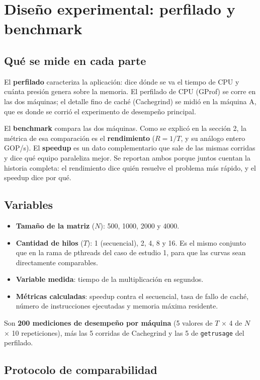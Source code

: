 \section{Diseño experimental: perfilado y benchmark}

\subsection{Qué se mide en cada parte}

El \textbf{perfilado} caracteriza la aplicación: dice dónde se va el tiempo de CPU y cuánta presión genera sobre la memoria. El perfilado de CPU (GProf) se corre en las dos máquinas; el detalle fino de caché (Cachegrind) se midió en la máquina A, que es donde se corrió el experimento de desempeño principal.

El \textbf{benchmark} compara las dos máquinas. Como se explicó en la sección 2, la métrica de esa comparación es el \textbf{rendimiento} ($R = 1/T$, y su análogo entero GOP/s). El \textbf{speedup} es un dato complementario que sale de las mismas corridas y dice qué equipo paraleliza mejor. Se reportan ambos porque juntos cuentan la historia completa: el rendimiento dice quién resuelve el problema más rápido, y el speedup dice por qué.

\subsection{Variables}

\begin{itemize}
    \item \textbf{Tamaño de la matriz} ($N$): 500, 1000, 2000 y 4000.
    \item \textbf{Cantidad de hilos} ($T$): 1 (secuencial), 2, 4, 8 y 16. Es el mismo conjunto que en la rama de pthreads del caso de estudio 1, para que las curvas sean directamente comparables.
    \item \textbf{Variable medida}: tiempo de la multiplicación en segundos.
    \item \textbf{Métricas calculadas}: speedup contra el secuencial, tasa de fallo de caché, número de instrucciones ejecutadas y memoria máxima residente.
\end{itemize}

Son \textbf{200 mediciones de desempeño por máquina} (5 valores de $T$ × 4 de $N$ × 10 repeticiones), más las 5 corridas de Cachegrind y las 5 de \texttt{getrusage} del perfilado.

\subsection{Protocolo de comparabilidad}

